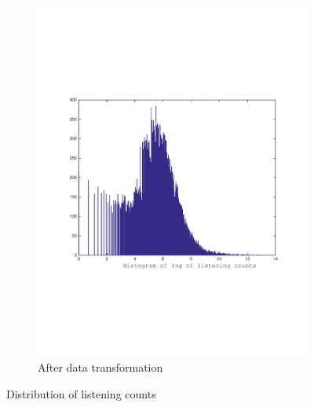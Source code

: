 \begin{figure}[h]
\begin{subfigure}[b]{0.45\textwidth}
    \includegraphics[width=\textwidth]{figures/histLogYtrain_crop.pdf}
    \caption{After data transformation}
  \end{subfigure}
  \caption{Distribution of listening counts}
  \label{fig:count_distribution}
\end{figure}

